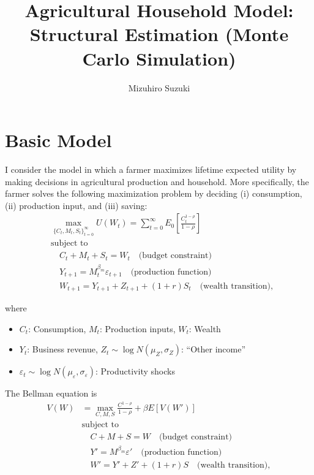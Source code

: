 \documentclass[12pt, fleqn]{article}
\begin{document}
\title{Agricultural Household Model: Structural Estimation (Monte Carlo Simulation)}
\author{Mizuhiro Suzuki}
\maketitle

\section{Basic Model}

I consider the model in which a farmer maximizes lifetime expected utility by making decisions in agricultural production and household.
More specifically, the farmer solves the following maximization problem by deciding (i) consumption, (ii) production input, and (iii) saving:
\begin{align*}
  &\max_{\{C_t, M_t, S_t\}_{t=0}^{\infty}} U(W_t) = \sum_{t=0}^{\infty} E_0\left[\frac{C_t^{1-\rho}}{1-\rho}\right] \\
        &\text{subject to} \\
        & \quad C_t + M_t + S_t = W_t                  \quad \text{(budget constraint)} \\
        & \quad Y_{t+1} = M_t^{\beta_m} \varepsilon_{t+1} \quad \text{(production function)} \\
        & \quad W_{t+1} = Y_{t+1} + Z_{t+1} + (1+r) S_t   \quad \text{(wealth transition)},
\end{align*}

where
\begin{itemize}
  \item $C_t$: Consumption, $M_t$: Production inputs, $W_t$: Wealth
  \item $Y_t$: Business revenue, $Z_t \sim \log N(\mu_Z, \sigma_Z)$: ``Other income''
  \item $\varepsilon_t \sim \log N(\mu_{\varepsilon}, \sigma_{\varepsilon})$: Productivity shocks
\end{itemize}

The Bellman equation is
\begin{align*}
  V(W) &= \max_{C, M, S} \frac{C^{1-\rho}}{1-\rho} + \beta E\left[V(W') \right] \\
        &\text{subject to} \\
        & \quad C + M + S = W                 \quad \text{(budget constraint)} \\
        & \quad Y' = M^{\beta_m} \varepsilon' \quad \text{(production function)} \\
        & \quad W' = Y' + Z' + (1+r) S        \quad \text{(wealth transition)},
\end{align*}
\end{document}
